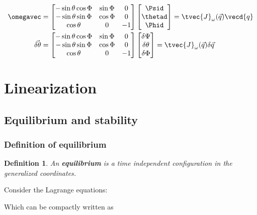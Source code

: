 \documentclass[10pt,a4paper]{scrartcl}
\newtheorem{define}{Definition}
\begin{document}
\begin{multicols*}{2}
\begin{align*}
\omegavec&=\begin{bmatrix}
-\sin\theta\cos\Phi&\sin\Phi&0\\
-\sin\theta\sin\Phi&\cos\Phi&0\\
\cos\theta&0&-1
\end{bmatrix}\begin{bmatrix}
\Psid\\\thetad\\\Phid
\end{bmatrix}
=\tvec{J}_\omega(\vec{q})\vecd{q}\\
\vec{\delta\theta}&=\begin{bmatrix}
-\sin\theta\cos\Phi&\sin\Phi&0\\
-\sin\theta\sin\Phi&\cos\Phi&0\\
\cos\theta&0&-1
\end{bmatrix}
\begin{bmatrix}
\delta\Psi\\
\delta\theta\\
\delta\Phi
\end{bmatrix}
=
\tvec{J}_\omega(\vec{q})\delta\vec{q}
\end{align*}

\section{Linearization}
\subsection{Equilibrium and stability}
\subsubsection{Definition of equilibrium}
\begin{define}
An \textbf{equilibrium} is a time independent configuration in the generalized coordinates.
\end{define}


Consider the Lagrange equations:


Which can be compactly written as 


\end{multicols*}
\end{document}
